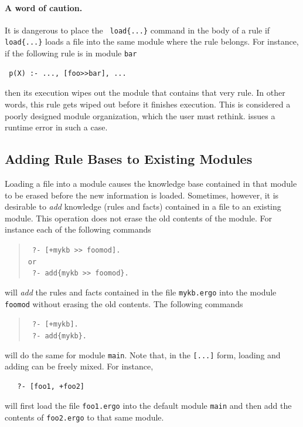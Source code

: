 \documentclass[11pt]{article}
\newcommand{\ERGO}{\mbox{\smaller{\ensuremath{\cal{E}}\smaller{{\sc{RGO}}}}}\xspace}
\newcommand{\FLSYSTEM}{\ERGO}
\newcommand{\ergoext}{ergo\xspace}
\begin{document}
\paragraph{A word of caution.} It is dangerous to place the {\tt
  load\{...\}} command
in the body of a rule if {\tt load\{...\}} loads a file into the same module
where the rule belongs. For instance, if the following rule is in module
{\tt bar}  
\begin{verbatim}
 p(X) :- ..., [foo>>bar], ...  
\end{verbatim}
then its execution wipes out the module that contains that very
rule. In other words,
this rule gets wiped out before it finishes execution.
This is considered a poorly designed module organization, which the
user must rethink.
\FLSYSTEM issues a runtime error in such a case.


\subsection{Adding Rule Bases to Existing Modules}\label{sec-adding-to-mod}

Loading a file into a module causes the knowledge base contained in that
module to be erased before the new information is loaded. Sometimes,
however, it is desirable to \emph{add} knowledge (rules and facts)
contained in a file to an existing module.
This operation does not erase the old contents of the module.
For instance each of the following commands 

\index{[+file]}
\begin{quote}
  \tt
   ?- [+mykb >{}> foomod].\\
   or
   \\
    \tt
   ?- add\{mykb >{}> foomod\}.
\end{quote}
will \emph{add} the rules and facts contained in the file {\tt mykb.\ergoext} into the
module {\tt foomod} without erasing the old contents. The following commands
\begin{quote}
  \tt
   ?- [+mykb].\\
    \tt
   ?- add\{mykb\}.
\end{quote}
will do the same for module {\tt main}. Note that, in the {\tt [...]} form,  
loading and adding can be freely mixed. For instance, 
\begin{verbatim}
   ?- [foo1, +foo2]  
\end{verbatim}
will first load the file {\tt foo1.\ergoext} into the default module {\tt main}
and then add the contents of {\tt foo2.\ergoext} to that same module.
\end{document}
